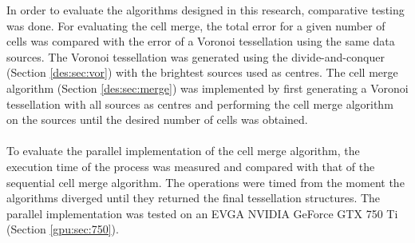 In order to evaluate the algorithms designed in this research, comparative testing was done. For evaluating the cell merge, the total error for a given number of cells was compared with the error of a Voronoi tessellation using the same data sources. The Voronoi tessellation was generated using the divide-and-conquer (Section \ref{des:sec:vor}) with the brightest sources used as centres. The cell merge algorithm (Section \ref{des:sec:merge}) was implemented by first generating a Voronoi tessellation with all sources as centres and performing the cell merge algorithm on the sources until the desired number of cells was obtained.
\\
\\
To evaluate the parallel implementation of the cell merge algorithm, the execution time of the process was measured and compared with that of the sequential cell merge algorithm. The operations were timed from the moment the algorithms diverged until they returned the final tessellation structures. The parallel implementation was tested on an EVGA NVIDIA GeForce GTX 750 Ti (Section \ref{gpu:sec:750}).